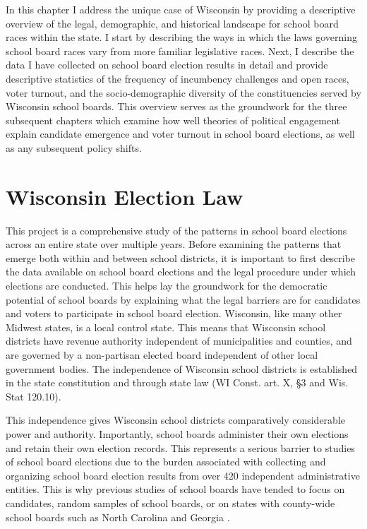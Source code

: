 In this chapter I address the unique case of Wisconsin by providing a descriptive 
overview of the legal, demographic, and historical landscape for school board races within 
the state. I start by describing the ways in which the laws governing 
school board races vary from more familiar legislative races. Next, I describe the data 
I have collected on school board election results in detail and provide descriptive 
statistics of the frequency of incumbency challenges and open races, voter turnout, 
and the socio-demographic diversity of the constituencies served by Wisconsin school 
boards. This overview serves as the groundwork for the three subsequent chapters 
which examine how well theories of political engagement explain candidate emergence and voter 
turnout in school board elections, as well as any subsequent policy shifts. 

\section{Wisconsin Election Law}
\label{sec:wiscolaw}
This project is a comprehensive study of the patterns in school board elections 
across an entire state over multiple years. Before examining the patterns that 
emerge both within and between school districts, it is important to first describe 
the data available on school board elections and the legal procedure under which 
elections are conducted. This helps lay the groundwork for the democratic potential 
of school boards by explaining what the legal barriers are for candidates and voters 
to participate in school board election. Wisconsin, like many other Midwest states, is a 
local control state. This means that Wisconsin school districts have revenue 
authority independent of municipalities and counties, and are governed by 
a non-partisan elected board independent of other local government 
bodies. The independence of Wisconsin school districts is established in the 
state constitution and through state law (WI Const. art. X, \S 3 and Wis. Stat 120.10). 

This independence gives Wisconsin school districts comparatively considerable power and authority. 
Importantly, school boards administer their own elections and retain their own 
election records. This represents a serious barrier to studies of school board 
elections due to the burden associated with collecting and organizing school board 
election results from over 420 independent administrative entities. This is why previous studies of 
school boards have tended to focus on candidates, random samples of school boards, 
or on states with county-wide school boards such as North Carolina and Georgia 
\citep{RefWorks:311,RefWorks:210,RefWorks:214}. 

